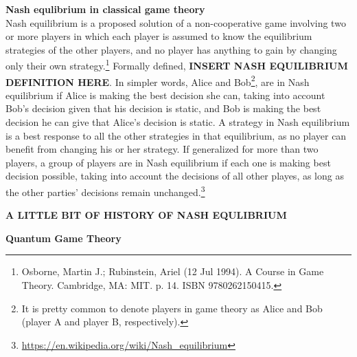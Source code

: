 \documentclass[12pt]{article}
\begin{document}
\begin{flushleft}
	\textbf{\Large Nash equlibrium in classical game theory} 
	\medskip\\Nash equilibrium is a proposed solution of a non-cooperative game involving two or more players in which each player is assumed to know the equilibrium strategies of the other players, and no player has anything to gain by changing only their own strategy.\footnote{Osborne, Martin J.; Rubinstein, Ariel (12 Jul 1994). A Course in Game Theory. Cambridge, MA: MIT. p. 14. ISBN 9780262150415.} Formally defined, \textbf{INSERT NASH EQUILIBRIUM DEFINITION HERE}. In simpler words, Alice and Bob\footnote{It is pretty common to denote players in game theory as Alice and Bob (player A and player B, respectively).}, are in Nash equilibrium if Alice is making the best decision she can, taking into account Bob's decision given that his decision is static, and Bob is making the best decision he can give that Alice's decision is static. A strategy in Nash equilibrium is a best response to all the other strategies in that equilibrium, as no player can benefit from changing his or her strategy. If generalized for more than two players, a group of players are in Nash equilibrium if each one is making best decision possible, taking into account the decisions of all other playes, as long as the other parties' decisions remain unchanged.\footnote{\url{https://en.wikipedia.org/wiki/Nash_equilibrium}} 

	\textbf{A LITTLE BIT OF HISTORY OF NASH EQULIBRIUM}

	\bigskip
	
	\textbf{\Large Quantum Game Theory}

	\end{flushleft}
\end{document}
